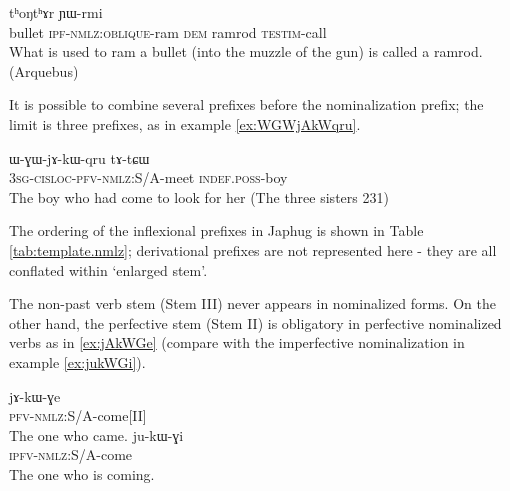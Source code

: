 \documentclass[oldfontcommands,oneside,a4paper,11pt]{article}
\newcommand{\ipa}[1]{{\phon #1}} %
\begin{document}
  
 \begin{exe}
\ex \label{ex:thongthar}
\gll [\ipa{qandʑi}   	\ipa{cʰɯ-sɤ-ɣnda}]   	\ipa{nɯ}   	\ipa{tʰoŋtʰɤr}   	  	\ipa{ɲɯ-rmi}    \\
bullet \textsc{ipf}-\textsc{nmlz:oblique}-ram   \textsc{dem} ramrod \textsc{testim}-call \\
 \glt What is used to ram a bullet (into the muzzle of the gun) is called a ramrod. (Arquebus)
 \end{exe}

It is possible to combine several prefixes before the nominalization prefix; the limit is three prefixes, as in example \ref{ex:WGWjAkWqru}.

 \begin{exe}
\ex \label{ex:WGWjAkWqru}
\gll
  	\ipa{ɯ-ɣɯ-jɤ-kɯ-qru}  	\ipa{tɤ-tɕɯ}  	   \\
  \textsc{3sg-cisloc-pfv-nmlz:}S/A-meet \textsc{indef.poss}-boy   \\
\glt The boy  who had come to look for her (The three sisters 231)
 \end{exe}
 
The ordering of the inflexional prefixes in  Japhug is shown in Table \ref{tab:template.nmlz}; derivational prefixes are not represented here - they are all conflated within   `enlarged stem'.



\begin{table}[H]
\caption{The template of nominalized verbal forms in Japhug} \centering \label{tab:template.nmlz}
\end{table}

The non-past verb stem (Stem III) never appears in nominalized forms. On the other hand, the perfective stem (Stem II) is obligatory in perfective nominalized verbs as in \ref{ex:jAkWGe} (compare with the imperfective nominalization in example \ref{ex:jukWGi}).

 \begin{exe}
\ex \label{ex:jAkWGe}
\gll
  	\ipa{jɤ-kɯ-ɣe}	   \\
  \textsc{pfv-nmlz:}S/A-come[II]   \\
\glt The one who came.
\ex \label{ex:jukWGi}
\gll
  	\ipa{ju-kɯ-ɣi}	   \\
  \textsc{ipfv-nmlz:}S/A-come   \\
\glt The one who is coming.
 \end{exe}
 
\end{document}
